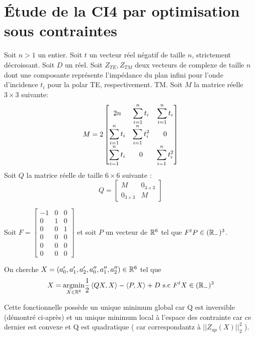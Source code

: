 \section{Étude de la CI4 par optimisation sous contraintes}

\newcommand{\st}{\ds\sum_{i=1}^n t_i}
\newcommand{\stc}{\ds\sum_{i=1}^n t_i^2 }
\newcommand{\mma}{\frac{\left(\st\right)^2 - 2n \stc}{\stc}}
\newcommand{\mmb}{\frac{\left(\st\right)^2}{\stc}}
Soit $n>1$ un entier.
Soit $t$ un vecteur réel négatif de taille $n$, strictement décroissant. Soit $D$ un réel.
Soit $Z_{TE}, Z_{TM}$ deux vecteurs de complexe de taille $n$ dont une composante représente l'impédance du plan infini pour l'onde d'incidence $t_i$ pour la polar TE, respectivement. TM.
Soit $M$ la matrice réelle $3\times3$ suivante:
\[
M = 2\begin{bmatrix}
2n & \st & \st \\
\st & \stc & 0 \\
\st & 0 & \stc
\end{bmatrix}
\]
Soit $Q$ la matrice réelle de taille $6 \times 6$ suivante :
\[
Q = \begin{bmatrix}
M & 0_{3 \times 3} \\
0_{3 \times 3} & M
\end{bmatrix}
\]

Soit $F = \begin{bmatrix}
-1 & 0 & 0 \\
0 & 1 & 0 \\
0 & 0 & 1 \\
0 & 0 & 0 \\
0 & 0 & 0 \\
0 & 0 & 0 
\end{bmatrix}$ et soit $P$ un vecteur de $\mathbb R^6$ tel que $ F^tP  \in (\mathbb R_-)^3$.

On cherche $X=(a_0', a_1', a_2',a_0'',a_1'',a_2'') \in \mathbb R^6$ tel que
\begin{align}
X = {\underset{X\in \mathbb R^6}{\operatorname{argmin}}} \dfrac{1}{2}\left<QX,X\right> - \left<P,X\right> + D \text{ s.c } F^tX \in (\mathbb R_-)^3
\end{align}

Cette fonctionnelle possède un unique minimum global car Q est inversible (démontré ci-après) et un unique minimum local à l'espace des contrainte car ce dernier est convexe et  Q est quadratique ( car correspondantz à $|| Z_{ap}(X)||_2^2$ ).

